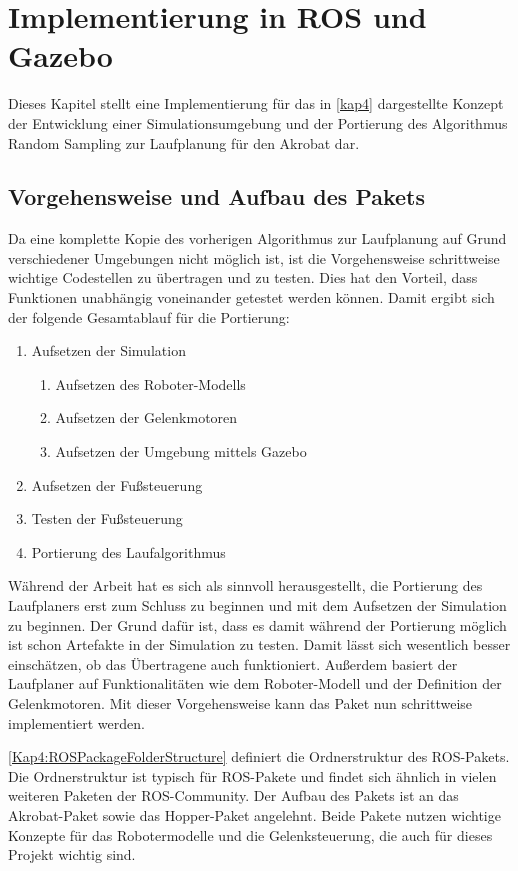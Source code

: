 \chapter{Implementierung in ROS und Gazebo}
\label{kap5}

Dieses Kapitel stellt eine Implementierung für das in \autoref{kap4} dargestellte Konzept der Entwicklung einer Simulationsumgebung und der Portierung des Algorithmus Random Sampling zur Laufplanung für den Akrobat dar.

\section{Vorgehensweise und Aufbau des Pakets}

Da eine komplette Kopie des vorherigen Algorithmus zur Laufplanung auf Grund verschiedener Umgebungen nicht möglich ist, ist die Vorgehensweise schrittweise wichtige Codestellen zu übertragen und zu testen. Dies hat den Vorteil, dass Funktionen unabhängig voneinander getestet werden können. Damit ergibt sich der folgende Gesamtablauf für die Portierung:
\begin{enumerate}
  \item Aufsetzen der Simulation
  \begin{enumerate}
    \item Aufsetzen des Roboter-Modells
    \item Aufsetzen der Gelenkmotoren
    \item Aufsetzen der Umgebung mittels Gazebo
  \end{enumerate}
  \item Aufsetzen der Fußsteuerung
  \item Testen der Fußsteuerung
  \item Portierung des Laufalgorithmus
\end{enumerate}

Während der Arbeit hat es sich als sinnvoll herausgestellt, die Portierung des Laufplaners erst zum Schluss zu beginnen und mit dem Aufsetzen der Simulation zu beginnen. Der Grund dafür ist, dass es damit während der Portierung möglich ist schon Artefakte in der Simulation zu testen. Damit lässt sich wesentlich besser einschätzen, ob das Übertragene auch funktioniert. Außerdem basiert der Laufplaner auf Funktionalitäten wie dem Roboter-Modell und der Definition der Gelenkmotoren. Mit dieser Vorgehensweise kann das Paket nun schrittweise implementiert werden.

\autoref{Kap4:ROSPackageFolderStructure} definiert die Ordnerstruktur des \ac{ROS}-Pakets. Die Ordnerstruktur ist typisch für \ac{ROS}-Pakete und findet sich ähnlich in vielen weiteren Paketen der \ac{ROS}-Community. Der Aufbau des Pakets ist an das Akrobat-Paket \autocite{akrobat} sowie das Hopper-Paket \autocite{hopper} angelehnt. Beide Pakete nutzen wichtige Konzepte für das Robotermodelle und die Gelenksteuerung, die auch für dieses Projekt wichtig sind.

